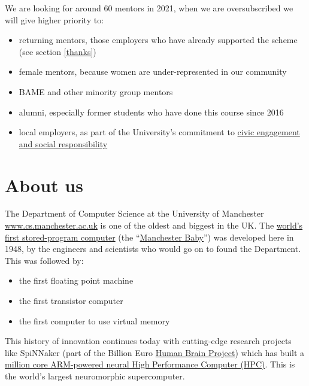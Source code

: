 \documentclass[
]{book}
\providecommand{\tightlist}{%
  \setlength{\itemsep}{0pt}\setlength{\parskip}{0pt}}
\begin{document}
We are looking for around 60 mentors in 2021, when we are oversubscribed we will give higher priority to:

\begin{itemize}
\tightlist
\item
  returning mentors, those employers who have already supported the scheme (see section \ref{thanks})
\item
  female mentors, because women are under-represented in our community
\item
  BAME and other minority group mentors
\item
  alumni, especially former students who have done this course since 2016
\item
  local employers, as part of the University's commitment to \href{https://www.manchester.ac.uk/discover/vision/\#panel-civic-engagement}{civic engagement and social responsibility}
\end{itemize}

\hypertarget{aboutus}{%
\section{About us}\label{aboutus}}

The Department of Computer Science at the University of Manchester \href{https://www.cs.manchester.ac.uk}{www.cs.manchester.ac.uk} is one of the oldest and biggest in the UK. The \href{http://www.computinghistory.org.uk/det/6013/The-Manchester-Baby-the-world-s-first-stored-program-computer-ran-its-first-program}{world's first stored-program computer} (the ``\href{https://en.wikipedia.org/wiki/Manchester_Baby}{Manchester Baby}'') was developed here in 1948, by the engineers and scientists who would go on to found the Department. This was followed by:

\begin{itemize}
\tightlist
\item
  the first floating point machine
\item
  the first transistor computer
\item
  the first computer to use virtual memory
\end{itemize}

This history of innovation continues today with cutting-edge research projects like SpiNNaker (part of the Billion Euro \href{https://www.humanbrainproject.eu/}{Human Brain Project}) which has built a \href{https://apt.cs.manchester.ac.uk/projects/SpiNNaker/project/}{million core ARM-powered neural High Performance Computer (HPC)}. This is the world's largest neuromorphic supercomputer.
\end{document}

